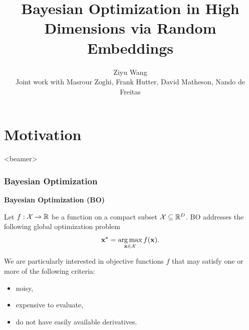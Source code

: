\documentclass[grey]{beamer}
\title{Bayesian Optimization in High Dimensions via Random Embeddings}
\author[Ziyu Wang]{Ziyu Wang\\ [3mm]Joint work with Masrour Zoghi, Frank Hutter, 
David Matheson, Nando de Freitas}
\date{}                    %
\DeclareMathOperator*{\argmax}{arg\,max}
\begin{document}
\begin{frame}
  \titlepage
\end{frame}

\section[Outline]{}

\begin{frame}
  \tableofcontents
\end{frame}


\section{Motivation}
\label{sec:ahmc}
\begin{frame}<beamer>
 \tableofcontents[currentsection]
\end{frame}

\begin{frame}
 \frametitle{Bayesian Optimization}
 {\bf \textcolor{myColor}{Bayesian Optimization (BO)}}

 Let $f: {\cal X} \to \mathbb{R}$ be a function on a compact subset 
 ${\cal X} \subseteq \mathbb{R}^D$. 
 BO addresses the following global optimization problem
 \[ \vx^{\star} = \argmax_{\vx \in {\cal X}} f(\vx). \]

 We are particularly interested in objective functions $f$ 
 that may satisfy one or more of the following criteria: 
 \begin{itemize}
  \item noisy,
  \item expensive to evaluate,
  \item do not have easily available derivatives.
 \end{itemize}
\end{frame}
\end{document}
